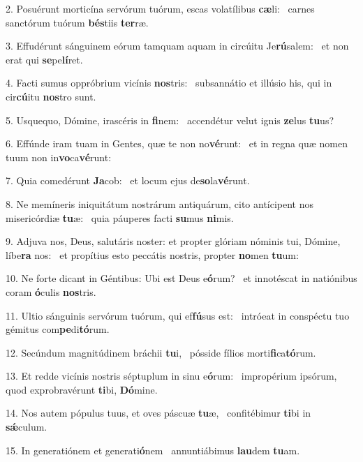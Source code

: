 2. Posuérunt morticína servórum tuórum, escas volatílibus \textbf{cæ}li: \ast\  carnes sanctórum tuórum \textbf{bés}tiis \textbf{ter}ræ.\

3. Effudérunt sánguinem eórum tamquam aquam in circúitu Je\textbf{rú}salem: \ast\  et non erat qui \textbf{se}pe\textbf{lí}ret.\

4. Facti sumus oppróbrium vicínis \textbf{nos}tris: \ast\  subsannátio et illúsio his, qui in cir\textbf{cú}itu \textbf{nos}tro sunt.\

5. Usquequo, Dómine, irascéris in \textbf{fi}nem: \ast\  accendétur velut ignis \textbf{ze}lus \textbf{tu}us?\

6. Effúnde iram tuam in Gentes, quæ te non no\textbf{vé}runt: \ast\  et in regna quæ nomen tuum non in\textbf{vo}ca\textbf{vé}runt:\

7. Quia comedérunt \textbf{Ja}cob: \ast\  et locum ejus de\textbf{so}la\textbf{vé}runt.\

8. Ne memíneris iniquitátum nostrárum antiquárum, cito antícipent nos misericórdiæ \textbf{tu}æ: \ast\  quia páuperes facti \textbf{su}mus \textbf{ni}mis.\

9. Adjuva nos, Deus, salutáris noster: et propter glóriam nóminis tui, Dómine, líbe\textbf{ra} nos: \ast\  et propítius esto peccátis nostris, propter \textbf{no}men \textbf{tu}um:\

10. Ne forte dicant in Géntibus: Ubi est Deus e\textbf{ó}rum? \ast\  et innotéscat in natiónibus coram \textbf{ó}culis \textbf{nos}tris.\

11. Ultio sánguinis servórum tuórum, qui ef\textbf{fú}sus est: \ast\  intróeat in conspéctu tuo gémitus com\textbf{pe}di\textbf{tó}rum.\

12. Secúndum magnitúdinem bráchii \textbf{tu}i, \ast\  pósside fílios morti\textbf{fi}ca\textbf{tó}rum.\

13. Et redde vicínis nostris séptuplum in sinu e\textbf{ó}rum: \ast\  impropérium ipsórum, quod exprobravérunt \textbf{ti}bi, \textbf{Dó}mine.\

14. Nos autem pópulus tuus, et oves páscuæ \textbf{tu}æ, \ast\  confitébimur \textbf{ti}bi in \textbf{sǽ}culum.\

15. In generatiónem et generati\textbf{ó}nem \ast\  annuntiábimus \textbf{lau}dem \textbf{tu}am.\

